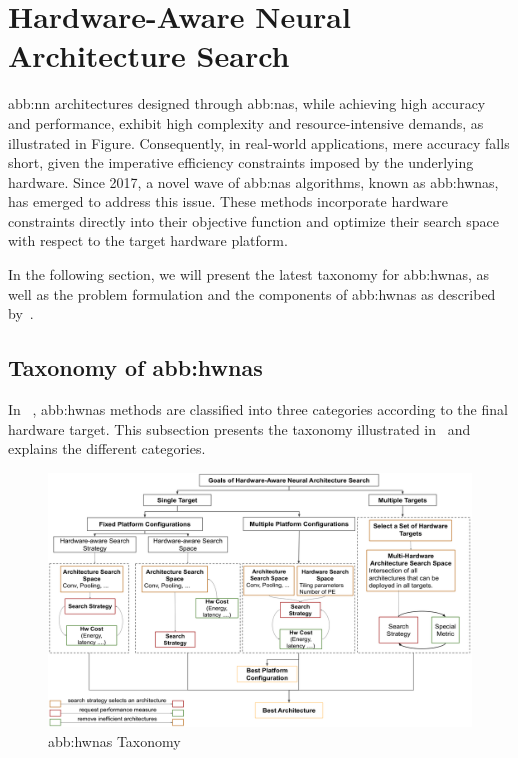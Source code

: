 \section{Hardware-Aware Neural Architecture Search}\label{sec:hw-nas:hwnas}

    \gls{abb:nn} architectures designed through \gls{abb:nas}, while achieving high accuracy and performance, exhibit high complexity and resource-intensive demands, as illustrated in Figure. Consequently, in real-world applications, mere accuracy falls short, given the imperative efficiency constraints imposed by the underlying hardware. Since 2017, a novel wave of \gls{abb:nas} algorithms, known as \gls{abb:hwnas}, has emerged to address this issue. These methods incorporate hardware constraints directly into their objective function and optimize their search space with respect to the target hardware platform.


    In the following section, we will present the latest taxonomy for \gls{abb:hwnas}, as well as the problem formulation and the components of \gls{abb:hwnas} as described by~\cite{hwnas-survey}.

    \subsection{Taxonomy of \gls{abb:hwnas}}
    
        In ~\cite{hwnas-survey}, \gls{abb:hwnas} methods are classified into three categories according to the final hardware target. This subsection presents the taxonomy illustrated in~ and explains the different categories.

        \begin{figure}[hbt]
            \begin{center}
            \includegraphics[width=1\textwidth]{assets/images/hwnas-taxonomy.png}
            \end{center}
            \caption{\gls{abb:hwnas} Taxonomy~\cite{hwnas-survey}}%
            \label{fig:chap1:hw-nas:hwnas}
        \end{figure}
        
